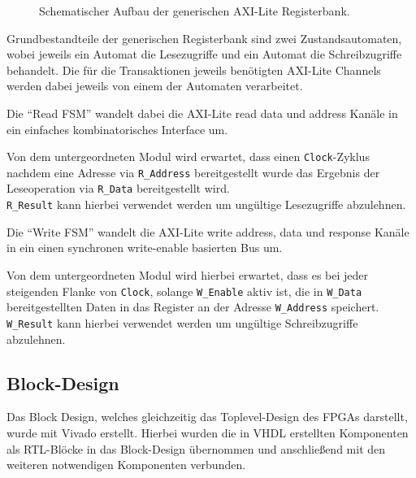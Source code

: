 \begin{figure}[h]
	\caption{Schematischer Aufbau der generischen \acs{AXI}-Lite Registerbank.}
\end{figure}

Grundbestandteile der generischen Registerbank sind zwei Zustandsautomaten, wobei jeweils ein Automat die Lesezugriffe und ein Automat die Schreibzugriffe behandelt.
Die für die Transaktionen jeweils benötigten \acs{AXI}-Lite Channels werden dabei jeweils von einem der Automaten verarbeitet.

Die \enquote{Read \acs{FSM}} wandelt dabei die \acs{AXI}-Lite read data und address Kanäle in ein einfaches kombinatorisches Interface um.

Von dem untergeordneten Modul wird erwartet, dass einen \lstinline|Clock|-Zyklus nachdem eine Adresse via \lstinline|R_Address| bereitgestellt wurde
das Ergebnis der Leseoperation via \lstinline|R_Data| bereitgestellt wird.\\
\lstinline|R_Result| kann hierbei verwendet werden um ungültige Lesezugriffe abzulehnen. 

Die \enquote{Write \acs{FSM}} wandelt die \acs{AXI}-Lite write address, data und response Kanäle in ein einen synchronen write-enable basierten Bus um.

Von dem untergeordneten Modul wird hierbei erwartet, dass es bei jeder steigenden Flanke von \lstinline|Clock|, solange \lstinline|W_Enable| aktiv ist, 
die in \lstinline|W_Data| bereitgestellten Daten in das Register an der Adresse \lstinline|W_Address| speichert.\\ 
\lstinline|W_Result| kann hierbei verwendet werden um ungültige Schreibzugriffe abzulehnen. 

\subsection{Block-Design}
Das Block Design, welches gleichzeitig das Toplevel-Design des \acs{FPGA}s darstellt, wurde mit Vivado erstellt.
Hierbei wurden die in \acs{VHDL} erstellten Komponenten als \acs{RTL}-Blöcke in das Block-Design übernommen und anschließend mit den weiteren notwendigen Komponenten verbunden.

